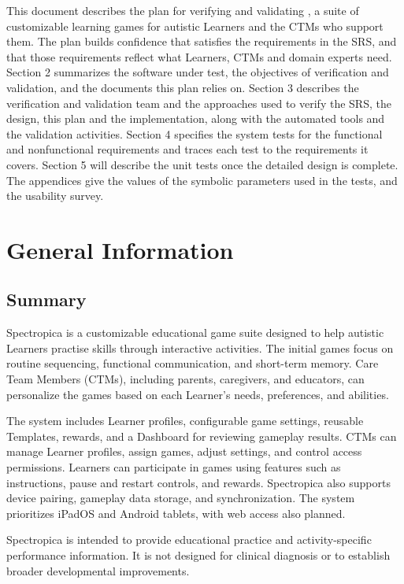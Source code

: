 \documentclass[12pt, titlepage]{article}
\newcounter{validation}
\begin{document}
\newpage


This document describes the plan for verifying and validating \progname{}, a suite of customizable learning games for autistic Learners and the CTMs who support them. The plan builds confidence that \progname{} satisfies the requirements in the SRS, and that those requirements reflect what Learners, CTMs and domain experts need. Section 2 summarizes the software under test, the objectives of verification and validation, and the documents this plan relies on. Section 3 describes the verification and validation team and the approaches used to verify the SRS, the design, this plan and the implementation, along with the automated tools and the validation activities. Section 4 specifies the system tests for the functional and nonfunctional requirements and traces each test to the requirements it covers. Section 5 will describe the unit tests once the detailed design is complete. The appendices give the values of the symbolic parameters used in the tests, and the usability survey.

\section{General Information}

\subsection{Summary}

Spectropica is a customizable educational game suite designed to help autistic
Learners practise skills through interactive activities. The initial games focus
on routine sequencing, functional communication, and short-term memory. Care
Team Members (CTMs), including parents, caregivers, and educators, can
personalize the games based on each Learner's needs, preferences, and abilities.

The system includes Learner profiles, configurable game settings, reusable
Templates, rewards, and a Dashboard for reviewing gameplay results. CTMs can
manage Learner profiles, assign games, adjust settings, and control access
permissions. Learners can participate in games using features such as
instructions, pause and restart controls, and rewards. Spectropica also supports
device pairing, gameplay data storage, and synchronization. The system
prioritizes iPadOS and Android tablets, with web access also planned.

Spectropica is intended to provide educational practice and activity-specific
performance information. It is not designed for clinical diagnosis or to
establish broader developmental improvements.
\end{document}
